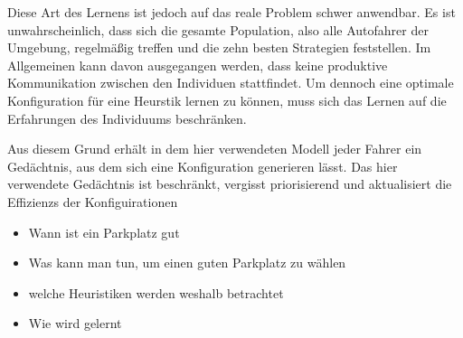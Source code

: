 Diese Art des Lernens ist jedoch auf das reale Problem schwer anwendbar. Es ist unwahrscheinlich, dass sich die gesamte Population, also alle Autofahrer der Umgebung, regelmäßig treffen und die zehn besten Strategien feststellen. Im Allgemeinen kann davon ausgegangen werden, dass keine produktive Kommunikation zwischen den Individuen stattfindet. Um dennoch eine optimale Konfiguration für eine Heurstik lernen zu können, muss sich das Lernen auf die Erfahrungen des Individuums beschränken. 

Aus diesem Grund erhält in dem hier verwendeten Modell jeder Fahrer ein Gedächtnis, aus dem sich eine Konfiguration generieren lässt. Das hier verwendete Gedächtnis ist beschränkt, vergisst priorisierend und aktualisiert die Effizienzs der Konfiguirationen



\begin{itemize}
	\item Wann ist ein Parkplatz gut
	\item Was kann man tun, um einen guten Parkplatz zu wählen
	\item welche Heuristiken werden weshalb betrachtet
	\item Wie wird gelernt
\end{itemize}